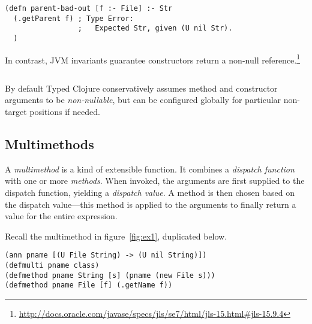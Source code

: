 \begin{verbatim}
(defn parent-bad-out [f :- File] :- Str
  (.getParent f) ; Type Error:
                 ;   Expected Str, given (U nil Str).
  )
\end{verbatim}

%

In contrast, JVM invariants guarantee constructors return a non-null reference.\footnote{\url{http://docs.oracle.com/javase/specs/jls/se7/html/jls-15.html#jls-15.9.4}}

\begin{exmp}
\inputminted[firstline=15,lastline=16]{clojure}{code/demo/src/demo/parent3.clj}
\end{exmp}

By default Typed Clojure conservatively assumes method and constructor arguments to be \emph{non-nullable},
but can be configured globally for particular non-target positions if needed.

\subsection{Multimethods}

\label{sec:multioverview}

A \emph{multimethod} is a kind of extensible function. It combines
a \emph{dispatch function} with one or more \emph{methods}.
When invoked, the arguments are first supplied to the dispatch function, yielding
a \emph{dispatch value}. A method is then chosen
based on the dispatch value---this method is applied to the arguments
to finally return a value for the entire expression.

Recall the multimethod in figure~\ref{fig:ex1}, duplicated below.

\begin{verbatim}
(ann pname [(U File String) -> (U nil String)])
(defmulti pname class)
(defmethod pname String [s] (pname (new File s)))
(defmethod pname File [f] (.getName f))
\end{verbatim}

